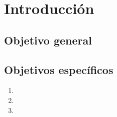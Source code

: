 
\chapter{Introducción} %

\label{Chapter1} %


\section{Objetivo general}
\lipsum[1]

\section{Objetivos específicos}
\begin{enumerate}
  \item \lipsum[1]
  \item \lipsum[2]
  \item \lipsum[3]
\end{enumerate}
